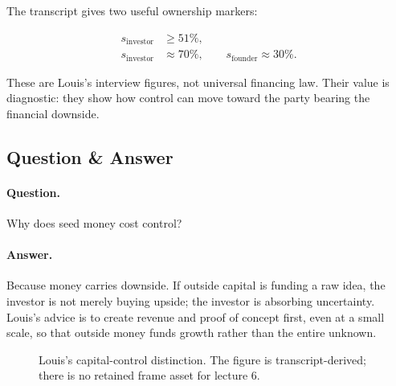 \documentclass[11pt,oneside]{book}
\begin{document}
The transcript gives two useful ownership markers:

\begin{align}
s_{\mathrm{investor}} &\geq 51\%,\\
s_{\mathrm{investor}} &\approx 70\%,
\qquad
s_{\mathrm{founder}}\approx 30\%.
\end{align}

These are Louis's interview figures, not universal financing law. Their value is diagnostic: they show how control can move toward the party bearing the financial downside.

\subsection{Question \& Answer}

\paragraph{Question.}
Why does seed money cost control?

\paragraph{Answer.}
Because money carries downside. If outside capital is funding a raw idea, the investor is not merely buying upside; the investor is absorbing uncertainty. Louis's advice is to create revenue and proof of concept first, even at a small scale, so that outside money funds growth rather than the entire unknown.

\begin{figure}
\centering
{}
\caption{Louis's capital-control distinction. The figure is transcript-derived; there is no retained frame asset for lecture 6.}
\end{figure}
\end{document}
